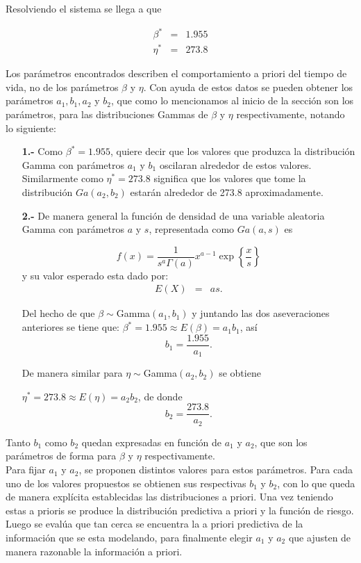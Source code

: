 Resolviendo el sistema se llega a que

\begin{eqnarray*}
\beta^{*}&=& 1.955\\
\eta^{*}&=& 273.8
\end{eqnarray*}

\noindent Los par\'ametros encontrados describen el comportamiento a priori del tiempo de vida, no de los par\'ametros $\beta$  y $\eta$. Con ayuda de estos datos se pueden obtener los par\'ametros $a_1, b_1, a_2$ y $b_2$, que como lo mencionamos al inicio de la secci\'on son los par\'ametros, para las distribuciones Gammas de  $\beta$ y $\eta$ respectivamente, notando lo siguiente:

\begin{enumerate}
\item[{\bf 1.-} ]
\noindent  Como $\beta^{*}= 1.955$, quiere decir que los valores que produzca la distribuci\'on Gamma con par\'ametros $a_1$ y $b_1$ oscilaran alrededor de estos valores. Similarmente como $\eta^{*}= 273.8$ significa que los valores que tome la distribuci\'on $Ga(a_2,b_2)$ estar\'an alrededor de 273.8 aproximadamente.
\item[{\bf 2.-} ]
\noindent De manera general  la funci\'on de densidad de una variable aleatoria Gamma con par\'ametros $a$ y $s$, representada como $Ga(a,s)$ es

$$f(x)=\frac{1}{s^a\Gamma(a)}x^{a-1}\exp\left\{\frac{x}{s}\right\}$$
y su valor esperado esta dado por:
\begin{eqnarray*}
E(X)&=& as.
\end{eqnarray*}

\noindent Del hecho de que  $\beta\sim $Gamma$(a_1,b_1)$ y  juntando las dos aseveraciones anteriores se tiene que: 
$\beta^{*}=1.955\approx E(\beta)=a_1b_1$, as\'i $$b_1=\frac{1.955}{a_1}.$$


De manera similar para  $\eta\sim $Gamma$(a_2,b_2)$ se obtiene

$\eta^{*}=273.8\approx E(\eta)=a_2b_2$, de donde
 $$b_2=\frac{273.8}{a_2}.$$

\end{enumerate}
Tanto $b_1$ como $b_2$ quedan expresadas en funci\'on de $a_1$ y $a_2$, que son los par\'ametros de forma para $\beta$ y $\eta$ respectivamente.\\[0.1cm]
Para  fijar $a_1$ y $a_2$, se  proponen distintos valores para estos par\'ametros. Para cada uno de los valores propuestos se obtienen sus respectivas $b_1$ y $b_2$, con lo que queda de manera expl\'icita establecidas las distribuciones a priori. Una vez teniendo estas a prioris se produce la distribuci\'on predictiva a priori y la funci\'on de riesgo. Luego se eval\'ua que tan cerca se encuentra la a priori predictiva de la informaci\'on que se esta modelando, para finalmente elegir $a_1$ y $a_2$ que ajusten  de manera razonable la informaci\'on a priori.

